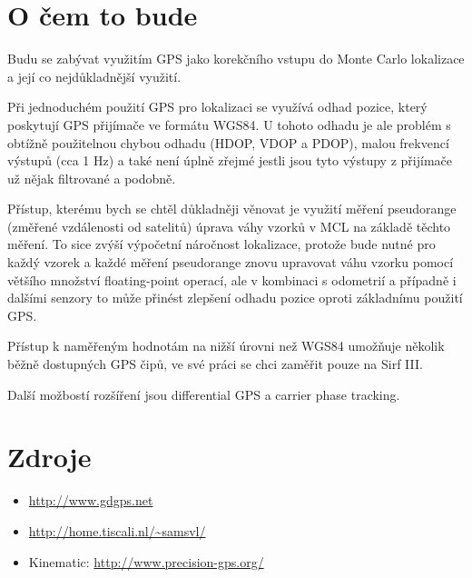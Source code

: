 \documentclass[12pt,notitlepage,pdftex,a4paper]{article}
\begin{document}
\section*{O čem to bude}

Budu se zabývat využitím GPS jako korekčního vstupu do Monte Carlo
lokalizace a její co nejdůkladnější využití.

Při jednoduchém použití GPS pro lokalizaci se využívá
odhad pozice, který poskytují GPS přijímače ve formátu WGS84.
U tohoto odhadu je ale problém s obtížně použitelnou chybou odhadu
(HDOP, VDOP a PDOP), malou frekvencí výstupů (cca 1 Hz) a také
není úplně zřejmé jestli jsou tyto výstupy z přijímače už nějak
filtrované a podobně.

Přístup, kterému bych se chtěl důkladněji věnovat je využití měření
pseudorange (změřené vzdálenosti od satelitů) úprava váhy vzorků v MCL
na základě těchto měření.
To sice zvýší výpočetní náročnost lokalizace, protože bude nutné pro
každý vzorek a každé měření pseudorange znovu upravovat váhu vzorku
pomocí většího množství floating-point operací, ale v kombinaci s
odometrií a případně i dalšími senzory to může přinést zlepšení
odhadu pozice oproti základnímu použití GPS.

Přístup k naměřeným hodnotám na nižší úrovni než WGS84 umožňuje
několik běžně dostupných GPS čipů, ve své práci se chci zaměřit
pouze na Sirf III.

Další možbostí rozšíření jsou differential GPS a carrier phase tracking.

\section*{Zdroje}

\begin{itemize}
\item \url{http://www.gdgps.net}

\item \url{http://home.tiscali.nl/~samsvl/}

\item Kinematic: \url{http://www.precision-gps.org/}

\end{itemize}
\end{document}
